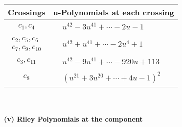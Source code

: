 \documentclass[1p]{elsarticle_modified}
\theoremstyle{definition}
\begin{document}
\begin{tabular}{m{50pt}|m{274pt}}
Crossings & \hspace{64pt}u-Polynomials at each crossing \\
\hline $$\begin{aligned}c_{1},c_{4}\end{aligned}$$&$\begin{aligned}
&u^{42}-3 u^{41}+\cdots-2 u-1
\end{aligned}$\\
\hline $$\begin{aligned}c_{2},c_{5},c_{6}\\c_{7},c_{9},c_{10}\end{aligned}$$&$\begin{aligned}
&u^{42}+u^{41}+\cdots-2 u^4+1
\end{aligned}$\\
\hline $$\begin{aligned}c_{3},c_{11}\end{aligned}$$&$\begin{aligned}
&u^{42}-9 u^{41}+\cdots-920 u+113
\end{aligned}$\\
\hline $$\begin{aligned}c_{8}\end{aligned}$$&$\begin{aligned}
&(u^{21}+3 u^{20}+\cdots+4 u-1)^{2}
\end{aligned}$\\
\hline
\end{tabular}\\~\\
\newpage\renewcommand{\arraystretch}{1}
\flushleft \textbf{(v) Riley Polynomials at the component}\newline \\
\end{document}
